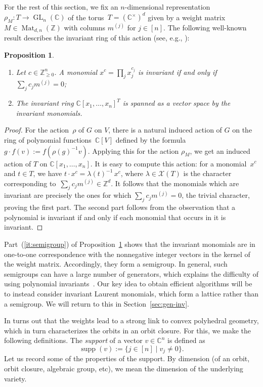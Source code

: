 \documentclass[10pt,a4paper]{article}
\DeclareMathOperator{\supp}{supp}
\DeclareMathOperator{\GL}{GL}
\DeclareMathOperator{\Mat}{Mat}
\newtheorem{proposition}[theorem]{Proposition}
\theoremstyle{definition}
\numberwithin{equation}{section}
\newcommand{\CC}{\mathbb{C}}
\newcommand{\ZZ}{\mathbb{Z}}
\newcommand{\NN}{\mathbb{Z}_{\geq 0}}
\begin{document}
For the rest of this section, we fix an $n$-dimensional representation $\rho_M \colon T \rightarrow \GL_n(\CC)$ of the torus~$T=(\CC^\times)^d$
given by a weight matrix $M \in \Mat_{d,n}(\ZZ)$ with columns $m^{(j)}$ for $j\in[n]$.
The following well-known result describes the invariant ring of this action (see, e.g., \cite[Section~3]{DM-exp}):

\begin{proposition}\label{pro:3.1}~
\begin{enumerate}
\item\label{it:semigroup} Let $c\in\NN^n$. A monomial $x^c=\prod_j x_j^{c_j}$ is invariant if and only if $\sum_j c_j m^{(j)} = 0$;
\item The invariant ring $\CC[x_1,\dots,x_n]^T$ is spanned as a vector space by the invariant monomials.
\end{enumerate}
\end{proposition}
\begin{proof}
For the action~$\rho$ of $G$ on $V$, there is a natural induced action of $G$ on the ring of polynomial functions~$\CC[V]$ defined by the formula $g \cdot f (v) := f(\rho(g)^{-1}v)$.
Applying this for the action $\rho_M$, we get an induced action of $T$ on $\CC[x_1,\dots,x_n]$.
It is easy to compute this action:
for a monomial~$x^c$ and $t \in T$, we have $t \cdot x^c = \lambda(t)^{-1} \, x^c$, where $\lambda \in \mathcal{X}(T)$ is the character corresponding to~$\sum_j c_j m^{(j)} \in \ZZ^d$.
It follows that the monomials which are invariant are precisely the ones for which $\sum_j c_j m^{(j)} = 0$, the trivial character, proving the first part.
The second part follows from the observation that a polynomial is invariant if and only if each monomial that occurs in it is invariant.
\end{proof}

Part~(\ref{it:semigroup}) of Proposition~\ref{pro:3.1} shows that the invariant monomials are in one-to-one correspondence with the nonnegative integer vectors in the kernel of the weight matrix.
Accordingly, they form a semigroup.
In general, such semigroups can have a large number of generators, which explains the difficulty of using polynomial invariants~\cite{durand-et-al:02}.
Our key idea to obtain efficient algorithms will be to instead consider invariant Laurent monomials, which form a lattice rather than a semigroup.
We will return to this in Section~\ref{sec:gen-inv}.

In turns out that the weights lead to a strong link to convex polyhedral geometry, which in turn characterizes the orbits in an orbit closure.
For this, we make the following definitions.
The \textit{support} of a vector $v\in \CC^n$ is defined as
\[
  \supp(v) := \{j\in [n]\mid v_j\neq 0\}.
\]
Let us record some of the properties of the support. By dimension (of an orbit, orbit closure, algebraic group, etc), we mean the dimension of the underlying variety.
\end{document}
